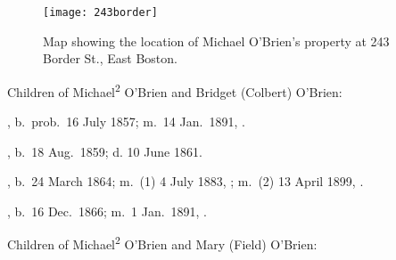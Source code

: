 \begin{figure}[htbp]
	\centering
	\texttt{[image: 243border]}
	\caption{Map showing the location of Michael O'Brien's property at 243 Border St., East Boston.}
	\label{fig:BorderSt}
\end{figure}

\begin{KidsIntro}
	Children of Michael\textsuperscript{2} O'Brien and Bridget (Colbert) O'Brien:
\end{KidsIntro}

\begin{Kids}
	
	, b.\ prob.\ 16 July 1857; m.\ 14 Jan.\ 1891, .
	
	, b.\ 18 Aug.\ 1859;\cite{MaryAnn3OBrien2Birth} d. 10 June 1861.\cite{MaryAnn3OBrien2Death}
	
	, b.\ 24 March 1864; m.\ (1) 4 July 1883, ; m.\ (2) 13 April 1899, .
	
	, b.\ 16 Dec.\ 1866; m.\ 1 Jan.\ 1891, .
	
\end{Kids}

\begin{KidsIntro}
	Children of Michael\textsuperscript{2} O'Brien and Mary (Field) O'Brien:
\end{KidsIntro}

